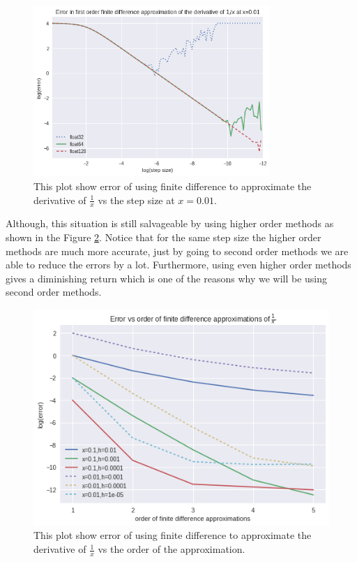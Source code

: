 \begin{figure}[hbt!]
    \centering
    \includegraphics[width=0.8\textwidth]{images/1_x_error_at_p01.png}
    \caption{This plot show error of using finite difference to approximate the derivative of $\frac{1}{x}$ vs the step size at $x = 0.01$.}
    \label{fig:1/x_0.01}
\end{figure}


Although, this situation is still salvageable by using higher order methods as shown in the Figure \ref{fig:1/x_error_vs_order}. Notice that for the same step size the higher order methods are much more accurate, just by going to second order methods we are able to reduce the errors by a lot. Furthermore, using even higher order methods gives a diminishing return which is one of the reasons why we will be using second order methods.

\begin{figure}[hbt!]
    \centering
    \includegraphics[width=\textwidth]{images/1_x_error_vs_order.png}
    \caption{This plot show error of using finite difference to approximate the derivative of $\frac{1}{x}$ vs the order of the approximation.}
    \label{fig:1/x_error_vs_order}
\end{figure}

